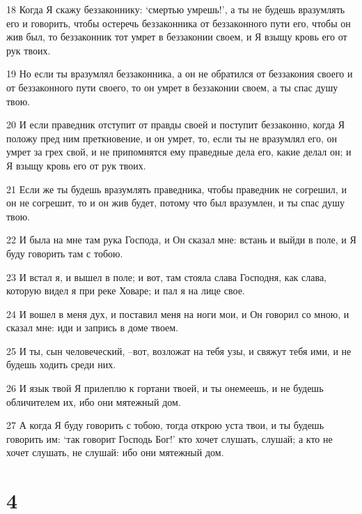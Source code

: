 \par 18 Когда Я скажу беззаконнику: `смертью умрешь!', а ты не будешь вразумлять его и говорить, чтобы остеречь беззаконника от беззаконного пути его, чтобы он жив был, то беззаконник тот умрет в беззаконии своем, и Я взыщу кровь его от рук твоих.
\par 19 Но если ты вразумлял беззаконника, а он не обратился от беззакония своего и от беззаконного пути своего, то он умрет в беззаконии своем, а ты спас душу твою.
\par 20 И если праведник отступит от правды своей и поступит беззаконно, когда Я положу пред ним преткновение, и он умрет, то, если ты не вразумлял его, он умрет за грех свой, и не припомнятся ему праведные дела его, какие делал он; и Я взыщу кровь его от рук твоих.
\par 21 Если же ты будешь вразумлять праведника, чтобы праведник не согрешил, и он не согрешит, то и он жив будет, потому что был вразумлен, и ты спас душу твою.
\par 22 И была на мне там рука Господа, и Он сказал мне: встань и выйди в поле, и Я буду говорить там с тобою.
\par 23 И встал я, и вышел в поле; и вот, там стояла слава Господня, как слава, которую видел я при реке Ховаре; и пал я на лице свое.
\par 24 И вошел в меня дух, и поставил меня на ноги мои, и Он говорил со мною, и сказал мне: иди и запрись в доме твоем.
\par 25 И ты, сын человеческий, --вот, возложат на тебя узы, и свяжут тебя ими, и не будешь ходить среди них.
\par 26 И язык твой Я прилеплю к гортани твоей, и ты онемеешь, и не будешь обличителем их, ибо они мятежный дом.
\par 27 А когда Я буду говорить с тобою, тогда открою уста твои, и ты будешь говорить им: `так говорит Господь Бог!' кто хочет слушать, слушай; а кто не хочет слушать, не слушай: ибо они мятежный дом.

\chapter{4}

